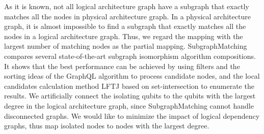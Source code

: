 \documentclass[runningheads]{llncs}
\begin{document}
As it is known, not all logical architecture graph have a subgraph that exactly matches all the nodes in physical architecture graph.
In a physical architecture graph, it is almost impossible to find a subgraph that exactly matches all the nodes in a logical architecture graph. Thus, we regard the mapping with the largest number of matching nodes as the partial mapping. SubgraphMatching compares several state-of-the-art subgraph isomorphism algorithm compositions. 
It shows that the best performance can be achieved by using filters and the sorting ideas of the GraphQL algorithm to process candidate nodes, and the local candidates calculation method LFTJ based on set-intersection to enumerate the results. We artificially connect the isolating qubits to the qubits with the largest degree in the logical architecture graph, since SubgraphMatching cannot handle disconnected graphs. We would like to minimize the impact of logical dependency graphs, thus map isolated nodes to nodes with the largest degree.
\end{document}

